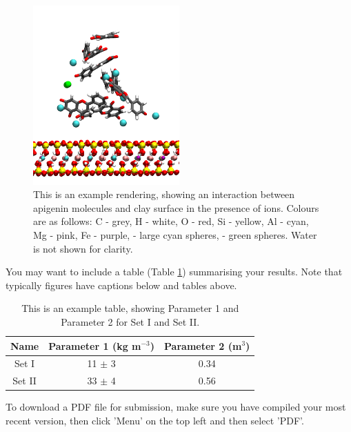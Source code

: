 \documentclass[a4paper,12pt]{scrarticle}
\begin{document}
\begin{figure}[h!]
    \begin{minipage}{\linewidth}
      \centering
      \includegraphics[width=0.5\textwidth]{my_rendering.png}
      \caption{This is an example rendering, showing an interaction between apigenin molecules and clay surface in the presence of ions.  Colours are as follows: C - grey, H - white, O - red, Si - yellow, Al - cyan, Mg - pink, Fe - purple,  - large cyan spheres,  - green spheres. Water is not shown for clarity.}
      \label{fig:render}
  \end{minipage}
\end{figure}

You may want to include a table (Table \ref{tab:results}) summarising your results. Note that typically figures have captions below and tables above.



\begin{table}[h!]
    \centering
    \caption{This is an example table, showing Parameter 1 and Parameter 2 for Set I and Set II.}
    \label{tab:results}
    \begin{tabular}{c | c c}
         Name &  Parameter 1 (kg m$^{-3}$) &  Parameter 2 (m$^{3}$) \\
         \hline
         Set I & 11 $\pm$ 3  & 0.34  \\
         Set II & 33 $\pm$ 4  & 0.56 \\
    \end{tabular}
\end{table}



To download a PDF file for submission, make sure you have compiled your most recent version, then click 'Menu' on the top left and then select 'PDF'.
\end{document}
